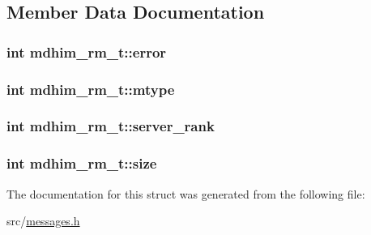 \subsection{Member Data Documentation}
\hypertarget{structmdhim__rm__t_af7305ef9c55d3d60b91610408a88893f}{
\subsubsection[{error}]{\setlength{\rightskip}{0pt plus 5cm}int mdhim\-\_\-rm\-\_\-t\-::error}}\label{structmdhim__rm__t_af7305ef9c55d3d60b91610408a88893f}
\hypertarget{structmdhim__rm__t_ad4fc1bc6965fe36cf6bef6c2813dba8d}{
\subsubsection[{mtype}]{\setlength{\rightskip}{0pt plus 5cm}int mdhim\-\_\-rm\-\_\-t\-::mtype}}\label{structmdhim__rm__t_ad4fc1bc6965fe36cf6bef6c2813dba8d}
\hypertarget{structmdhim__rm__t_a8c6b340ab11d8fb8c7d8540cb59d9246}{
\subsubsection[{server\-\_\-rank}]{\setlength{\rightskip}{0pt plus 5cm}int mdhim\-\_\-rm\-\_\-t\-::server\-\_\-rank}}\label{structmdhim__rm__t_a8c6b340ab11d8fb8c7d8540cb59d9246}
\hypertarget{structmdhim__rm__t_addf21a3b828da693b9953e4a0d7d0c21}{
\subsubsection[{size}]{\setlength{\rightskip}{0pt plus 5cm}int mdhim\-\_\-rm\-\_\-t\-::size}}\label{structmdhim__rm__t_addf21a3b828da693b9953e4a0d7d0c21}


The documentation for this struct was generated from the following file\-:\begin{DoxyCompactItemize}
\item 
src/\hyperlink{messages_8h}{messages.\-h}\end{DoxyCompactItemize}
